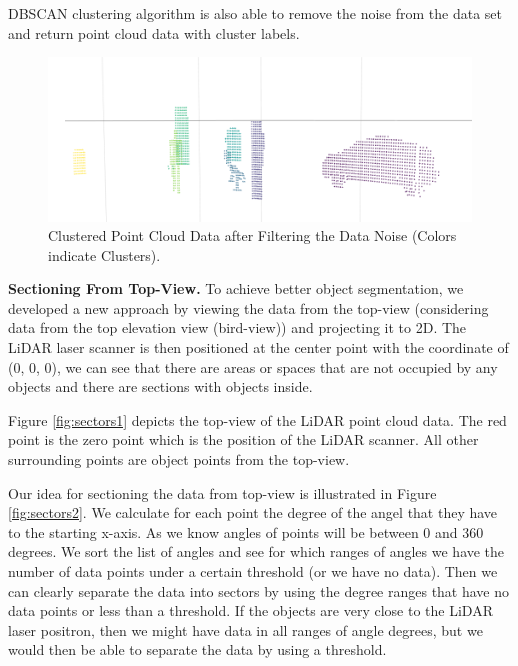 DBSCAN clustering algorithm is also able to remove the noise from the data set and return point cloud data with cluster labels.


\begin{figure}[!h]
\begin{center}
  \includegraphics[width=.65\linewidth]{./images/seg_noise_removal.png}
  \caption{Clustered Point Cloud Data after Filtering the Data Noise (Colors indicate Clusters). }
  \label{fig:ClusteringWithNoiseFiltering}
\end{center}
\end{figure}



\textbf{Sectioning From Top-View.}
To achieve better object segmentation, we developed a new approach by viewing the data from the top-view (considering data from the top elevation view (bird-view)) and projecting it to 2D. The LiDAR laser scanner is then positioned at the center point with the coordinate of (0, 0, 0), we can see that there are areas or spaces that are not occupied by any objects and there are sections with objects inside.

Figure \ref{fig:sectors1} depicts the top-view of the LiDAR point cloud data.
The red point is the zero point which is the position of the LiDAR scanner. All other surrounding points are object points from the top-view.

Our idea for sectioning the data from top-view is illustrated in Figure \ref{fig:sectors2}. We calculate for each point the degree of the angel that they have to the starting x-axis. As we know angles of points will be between 0 and 360 degrees. We sort the list of angles and see for which ranges of angles we have the number of data points under a certain threshold (or we have no data). Then we can clearly separate the data into sectors by using the degree ranges that have no data points or less than a threshold. If the objects are very close to the LiDAR laser positron, then we might have data in all ranges of angle degrees, but we would then be able to separate the data by using a threshold.


